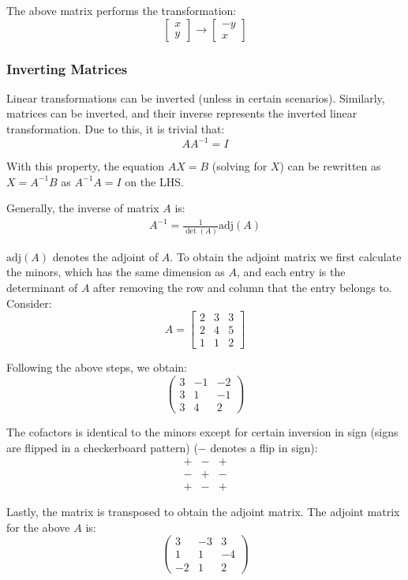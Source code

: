 \documentclass[12pt]{article}
\newcommand{\adj}{\text{adj}}
\theoremstyle{definition}
\begin{document}
	The above matrix performs the transformation:
	\begin{equation*}
		\begin{bmatrix}
			x \\ y
		\end{bmatrix} \to \begin{bmatrix}
			-y \\ x
		\end{bmatrix}
	\end{equation*}
	
	\subsubsection{Inverting Matrices}
	
	Linear transformations can be inverted (unless in certain scenarios). Similarly, matrices can be inverted, and their inverse represents the inverted linear transformation. Due to this, it is trivial that:
	$$AA^{-1} = I$$
	
	With this property, the equation $AX = B$ (solving for $X$) can be rewritten as $X = A^{-1}B$ as $A^{-1}A = I$ on the LHS.
	
	Generally, the inverse of matrix $A$ is:
	\begin{gather*}
		A^{-1} = \frac{1}{\det(A)} \adj(A)
	\end{gather*}
	
	$\adj(A)$ denotes the adjoint of $A$. To obtain the adjoint matrix we first calculate the minors, which has the same dimension as $A$, and each entry is the determinant of $A$ after removing the row and column that the entry belongs to. Consider:
	\begin{equation*}
		A = \begin{bmatrix}
			2 & 3 & 3 \\ 2 & 4 & 5 \\ 1 & 1 & 2
		\end{bmatrix}
	\end{equation*}
	
	Following the above steps, we obtain:
	\begin{equation*}
		\begin{pmatrix}
			3 & -1 & -2 \\ 3 & 1 & -1 \\ 3 & 4 & 2
		\end{pmatrix}
	\end{equation*}
	
	The cofactors is identical to the minors except for certain inversion in sign (signs are flipped in a checkerboard pattern) ($-$ denotes a flip in sign):
	\begin{equation*}
		\begin{matrix}
			+ & - & + \\ - & + & - \\ + & - & +
		\end{matrix}
	\end{equation*}
	
	Lastly, the matrix is transposed to obtain the adjoint matrix. The adjoint matrix for the above $A$ is:
	\begin{equation*}
		\begin{pmatrix}
			3 & -3 & 3 \\ 1 & 1 & -4 \\ -2 & 1 & 2
		\end{pmatrix}
	\end{equation*}
	
\end{document}
